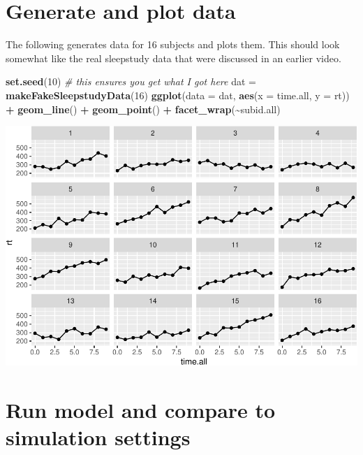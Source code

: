 \documentclass[
]{book}
\newenvironment{Shaded}{\begin{snugshade}}{\end{snugshade}}
\newcommand{\CommentTok}[1]{\textcolor[rgb]{0.56,0.35,0.01}{\textit{#1}}}
\newcommand{\DataTypeTok}[1]{\textcolor[rgb]{0.13,0.29,0.53}{#1}}
\newcommand{\DecValTok}[1]{\textcolor[rgb]{0.00,0.00,0.81}{#1}}
\newcommand{\KeywordTok}[1]{\textcolor[rgb]{0.13,0.29,0.53}{\textbf{#1}}}
\newcommand{\NormalTok}[1]{#1}
\newcommand{\OperatorTok}[1]{\textcolor[rgb]{0.81,0.36,0.00}{\textbf{#1}}}
\newcommand{\StringTok}[1]{\textcolor[rgb]{0.31,0.60,0.02}{#1}}
\begin{document}
\hypertarget{generate-and-plot-data}{%
\section{Generate and plot data}\label{generate-and-plot-data}}

The following generates data for 16 subjects and plots them. This should look somewhat like the real sleepstudy data that were discussed in an earlier video.

\begin{Shaded}
\begin{Highlighting}[]
\KeywordTok{set.seed}\NormalTok{(}\DecValTok{10}\NormalTok{) }\CommentTok{\# this ensures you get what I got here}
\NormalTok{dat =}\StringTok{ }\KeywordTok{makeFakeSleepstudyData}\NormalTok{(}\DecValTok{16}\NormalTok{)}
\KeywordTok{ggplot}\NormalTok{(}\DataTypeTok{data =}\NormalTok{ dat, }\KeywordTok{aes}\NormalTok{(}\DataTypeTok{x =}\NormalTok{ time.all, }\DataTypeTok{y =}\NormalTok{ rt)) }\OperatorTok{+}
\StringTok{  }\KeywordTok{geom\_line}\NormalTok{() }\OperatorTok{+}\StringTok{ }
\StringTok{  }\KeywordTok{geom\_point}\NormalTok{() }\OperatorTok{+}
\StringTok{  }\KeywordTok{facet\_wrap}\NormalTok{(}\OperatorTok{\textasciitilde{}}\NormalTok{subid.all)}
\end{Highlighting}
\end{Shaded}

\includegraphics{1_video3_2_level_illustration_files/figure-latex/unnamed-chunk-2-1.pdf}

\hypertarget{run-model-and-compare-to-simulation-settings}{%
\section*{Run model and compare to simulation settings}\label{run-model-and-compare-to-simulation-settings}}
\end{document}
